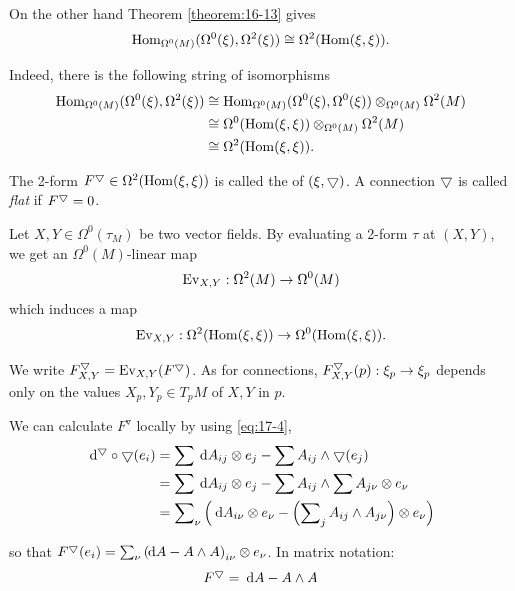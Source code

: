 On the other hand Theorem \ref{theorem:16-13} gives
\begin{align}\label{eq:17-9}
  {\operatorname{Hom}}_{\Omega^0(M) }( {\Omega^0(\xi),\Omega^{2}(\xi) })  \cong  \Omega^{2}( \operatorname{Hom}(\xi, \xi)).
\end{align}

Indeed, there is the following string of isomorphisms
\begin{align*}
  \operatorname{Hom}_{\Omega^0(M) }( {\Omega^0(\xi),\Omega^{2}(\xi) })  
  & \cong  {\mathrm{{Hom}}}_{\Omega^0(M) }( {\Omega^0(\xi),\Omega^0(\xi) }) \otimes_{\Omega^0(M) }\Omega^{2}(M) \\
  & \cong  \Omega^0( \operatorname{Hom}(\xi, \xi)) \otimes_{\Omega^0(M) }\Omega^{2}(M) \\
  & \cong  \Omega^{2}( \operatorname{Hom}(\xi, \xi)).
\end{align*}


\begin{definition}\label{definition:17-7}
The 2-form ${F}^\bigtriangledown \in  \Omega^{2}( \operatorname{Hom}(\xi, \xi))$ is called the  of $( {\xi, \bigtriangledown  })$. 
A connection $\bigtriangledown$ is called \textit{flat} if ${F}^\bigtriangledown = 0$.
\end{definition}

Let $X,Y \in  \Omega^0( {\tau }_{M})$ be two vector fields. By evaluating a 2-form $\tau$ at $(X, Y)$, we 
get an $\Omega^0(M)$-linear map
\[
  \mathrm{Ev}_{X, Y}:\Omega^{2}(M)  \rightarrow  \Omega^0(M)
\]
which induces a map
\[
  \mathrm{Ev}_{X, Y}:\Omega^{2}( \operatorname{Hom}(\xi, \xi))  \rightarrow  \Omega^0( \operatorname{Hom}(\xi, \xi)).
\]

We write ${F}_{X, Y}^\bigtriangledown = \mathrm{Ev}_{X, Y}( {F}^\bigtriangledown)$. As for 
connections, ${F}_{X, Y}^\bigtriangledown(p) :{\xi }_{p} \rightarrow  {\xi }_{p}$ depends only on 
the values $X_{p},{Y}_{p} \in  {T}_{p}M$ of $X,Y$ in $p$.

We can calculate ${F}^{ \triangledown  }$ locally by using \eqref{eq:17-4},
\begin{align*}
  \dd^\btd \circ  \btd ( {e}_{i}) 
  & = \sum \dd{A}_{ij} \otimes  {e}_{j}- \sum {A}_{ij} \land  \btd ( {e}_{j}) \\
  & = \sum \dd{A}_{ij} \otimes  {e}_{j}- \sum {A}_{ij} \land  \sum {A}_{j\nu } \otimes  {e}_{\nu } \\
  & = \sum\nolimits_\nu\left( {\dd{A}_{i\nu } \otimes  {e}_{\nu }- \left( {\sum\nolimits_{j}{A}_{ij} \land  {A}_{j\nu }}\right) \otimes  {e}_{\nu }}\right)
\end{align*}

so that ${F}^\btd( {e}_{i})  = \sum_{\nu }{(\!\dd A- A \land  A) }_{i\nu } \otimes  {e}_{\nu }$. 
In matrix notation:
\begin{align}\label{eq:17-10}
  {F}^\btd = {\dd A}- A \land  A
\end{align}

